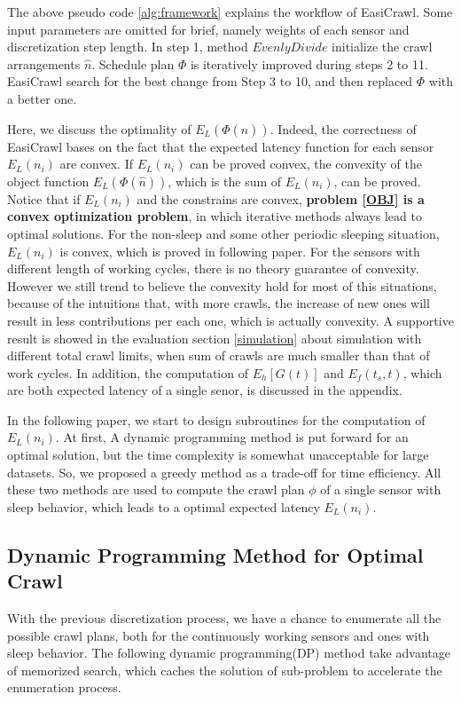 \documentclass[conference]{IEEEtran}
\begin{document}
The above pseudo code \ref{alg:framework} explains the workflow of EasiCrawl. 
Some input parameters are omitted for brief, namely weights of each sensor and discretization step length.
In step 1, method $EvenlyDivide$ initialize the crawl arrangements $\hat{n}$. 
Schedule plan $\Phi$ is iteratively improved during steps 2 to 11. 
EasiCrawl search for the best change from Step 3 to 10, and then replaced $\Phi$ with a better one.

Here, we discuss the optimality of $E_L(\Phi(\hat{n}))$.
Indeed, the correctness of EasiCrawl bases on the fact that the expected latency function for each sensor $E_L(n_i)$ are convex. 
If $E_L(n_i)$ can be proved convex, the convexity of the object function $E_L(\Phi(\hat{n}))$, which is the sum of $E_L(n_i)$, can be proved.
Notice that if $E_L(n_i)$ and the constrains are convex, \textbf{problem \eqref{OBJ} is a convex optimization problem}, in which iterative methods always lead to optimal solutions.
For the non-sleep and some other periodic sleeping situation, $E_L(n_i)$ is convex, which is proved in following paper.
For the sensors with different length of working cycles, there is no theory guarantee of convexity.
However we still trend to believe the convexity hold for most of this situations, because of the intuitions that, with more crawls, the increase of new ones will result in less contributions per each one, which is actually convexity.
A supportive result is showed in the evaluation section \ref{simulation} about simulation with different total crawl limits, when sum of crawls are much smaller than that of work cycles.
In addition, the computation of $E_h[G(t)]$ and $E_f(t_s,t)$, which are both expected latency of a single senor, is discussed in the appendix.

In the following paper, we start to design subroutines for the computation of $E_L(n_i)$.
At first, A dynamic programming method is put forward for an optimal solution,  but the time complexity is somewhat unacceptable for large datasets.
So, we proposed a greedy method as a trade-off for time efficiency. 
All these two methods are used to compute the crawl plan $\phi$ of a single sensor with sleep behavior, which leads to a optimal expected latency $E_L(n_i)$.

\subsection{Dynamic Programming Method for Optimal Crawl}

With the previous discretization process, we have a chance to enumerate all the possible crawl plans, both for the continuously working sensors and ones with sleep behavior. 
The following dynamic programming(DP) method take advantage of memorized search, which caches the solution of sub-problem to accelerate the enumeration process.
\end{document}
